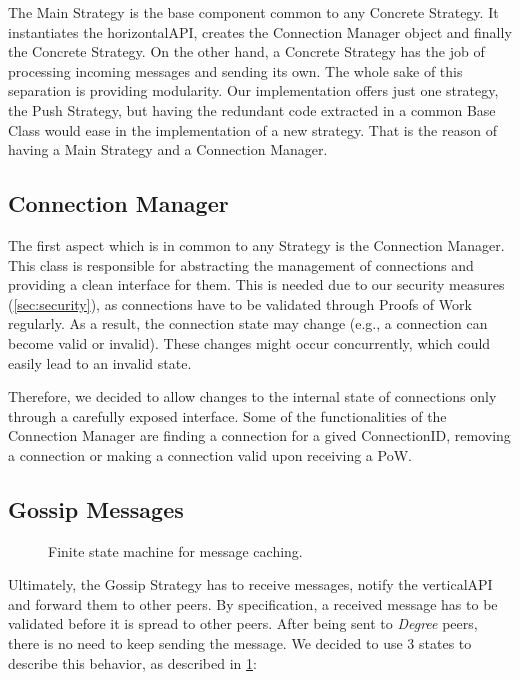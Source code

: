\documentclass[a4paper,english,10pt,NET]{tumarticle}
\begin{document}
The Main Strategy is the base component common to any Concrete Strategy. It instantiates the horizontalAPI, creates the Connection Manager object and finally the Concrete Strategy. On the other hand, a Concrete Strategy  has the job of processing incoming messages and sending its own. The whole sake of this separation is providing modularity. Our implementation offers just one strategy, the Push Strategy, but having the redundant code extracted in a common Base Class would ease in the implementation of a new strategy. That is the reason of having a Main Strategy and a Connection Manager.


\subsection{Connection Manager}

The first aspect which is in common to any Strategy is the Connection Manager. This class is responsible for abstracting the management of connections and providing a clean interface for them. This is needed due to our security measures (\cref{sec:security}), as connections have to be validated through Proofs of Work regularly. As a result, the connection state may change (e.g., a connection can become valid or invalid). These changes might occur concurrently, which could easily lead to an invalid state.

Therefore, we decided to allow changes to the internal state of connections only through a carefully exposed interface. Some of the functionalities of the Connection Manager are finding a connection for a gived ConnectionID, removing a connection or making a connection valid upon receiving a PoW.

\subsection{Gossip Messages}

\begin{figure}
	\centering
	
	\caption{Finite state machine for message caching.}
	\label{fig:fsm_msgs}
\end{figure}

Ultimately, the Gossip Strategy has to receive messages, notify the verticalAPI and forward them to other peers. By specification, a received message has to be validated before it is spread to other peers. After being sent to \textit{Degree} peers, there is no need to keep sending the message. We decided to use 3 states to describe this behavior, as described in \cref{fig:fsm_msgs}: 
\end{document}
